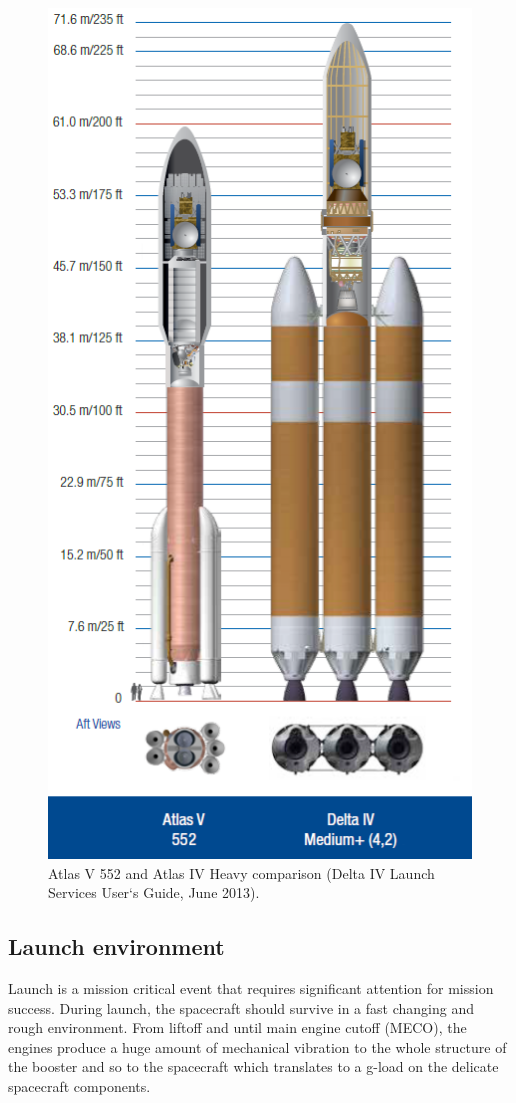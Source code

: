 \begin{figure}[h!]
\centering
\includegraphics[scale=0.8]{figures/Orbiter/launchv.png}
\caption{Atlas V 552 and Atlas IV Heavy comparison (Delta IV Launch Services User‘s Guide, June 2013).\cite{Atlasm}}
\end{figure}

\subsection{Launch environment}
Launch is a mission critical event that requires significant attention for mission success. During launch, the spacecraft should survive in a fast changing and rough environment. From liftoff and until main engine cutoff (MECO), the engines produce a huge amount of mechanical vibration to the whole structure of the booster and so to the spacecraft which translates to a g-load on the delicate spacecraft components. 

